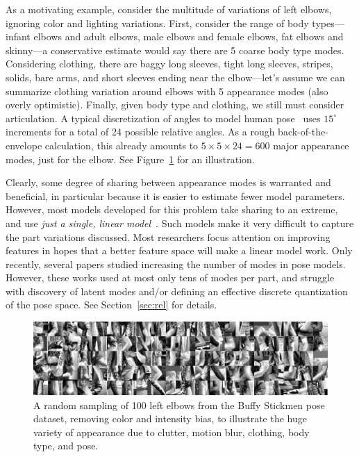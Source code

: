 As a motivating example, consider the multitude of variations of left elbows, 
ignoring color and lighting variations.  First, consider the range of body 
types---infant elbows and adult elbows, male elbows and female elbows, fat 
elbows and skinny---a conservative estimate would say there are 5 coarse body 
type modes.  Considering clothing, there are baggy long sleeves, tight long 
sleeves, stripes, solids, bare arms, and short sleeves ending near the 
elbow---let's assume we can summarize clothing variation around elbows with 5 
appearance modes (also overly optimistic).  Finally, given body type and 
clothing, we still must consider articulation.  A typical discretization of 
angles to model human pose~\cite{felz05,devacrf,eichner09} uses $15^\circ$ 
increments for a total of 24 possible relative angles.  As a rough 
back-of-the-envelope calculation, this already amounts to $5 \times 5 \times 24 
= 600$ major appearance modes, just for the elbow.  See Figure~\ref{fig:lelbs} 
for an illustration.


Clearly, some degree of sharing between appearance modes is warranted and 
beneficial, in particular because it is easier to estimate fewer model 
parameters.  However, most models developed for this problem take sharing to an 
extreme, and use {\em just a single, linear 
model}~\cite{devacrf,eichner09,sapp2010cascades,sapp2011,andriluka09,ddtran}.  
Such models make it very difficult to capture the part variations discussed.  
Most researchers focus attention on improving features in hopes that a better 
feature space will make a linear model work.  Only recently, several papers 
studied increasing the number of modes in pose models. However, these works 
used at most only tens of modes per part, and struggle with discovery of latent 
modes and/or defining an effective discrete quantization of the pose space.  
See Section~\ref{sec:rel} for details.

\begin{figure}[tb!]
\centering
\includegraphics[width=0.99\linewidth]{figs/lelbs.jpg}
\caption{ \label{fig:lelbs} A random sampling of 100 left elbows from the Buffy 
Stickmen pose dataset, removing color and intensity bias, to illustrate the 
huge variety of appearance due to clutter, motion blur, clothing, body type, 
and pose.}
\end{figure}

